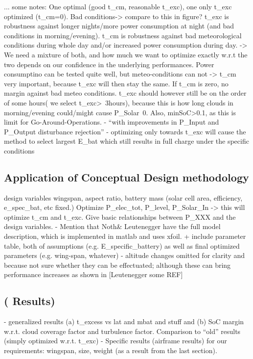 \documentclass[letterpaper, 10 pt, conference]{ieeeconf}  %
\begin{document}
 ... some notes:
 One optimal (good t\_cm, reasonable t\_exc), one only t\_exc optimized (t\_cm=0). Bad conditions-> compare to this in figure?
 t\_exc is robustness against longer nights/more power consumption at night (and bad conditions in morning/evening). t\_cm is robustness against bad meteorological conditions during whole day and/or increased power consumption during day. -> We need a mixture of both, and how much we want to optimize exactly w.r.t the two depends on our confidence in the underlying performances. Power consumptino can be tested quite well, but meteo-conditions can not -> t\_cm very important, because t\_exc will then stay the same. If t\_cm is zero, no margin against bad meteo conditions. t\_exc should however still be on the order of some hours( we select t\_exc>~3hours), because this is how long clouds in morning/evening could/might cause P\_Solar~0. Also, minSoC>0.1, as this is limit for Go-Around-Operations.
 - ``with improvements in P\_Input and P\_Output disturbance rejection''
 - optimizing only towards t\_exc will cause the method to select largest E\_bat which still results in full charge under the specific conditions
 
 \subsection{Application of Conceptual Design methodology}
 design variables wingspan, aspect ratio, battery mass (solar cell area, efficiency, e\_spec\_bat, etc fixed.)
 Optimize P\_elec\_tot, P\_level, P\_Solar\_In -> this will optimize t\_cm and t\_exc. Give basic relationships between P\_XXX and the design variables. 
  - Mention that Noth\& Leutenegger have the full model description, which is implemented in matlab and uses xfoil.
    + include parameter table, both of assumptions (e.g. E\_specific\_battery) as well as final optimized parameters (e.g. wing-span, whatever)
     - altitude changes omitted for clarity and because not sure whether they can be effectuated; although these can bring performance increases as shown in [Leutenegger some REF]
 
 \subsection{( Results)}
   - generalized results (a) t\_excess vs lat and mbat and stuff and (b) SoC margin w.r.t. cloud coverage factor and turbulence factor. Comparison to ``old'' results (simply optimized w.r.t. t\_exc)
   - Specific results (airframe results) for our requirements: wingspan, size, weight (as a result from the last section).
  
\end{document}
